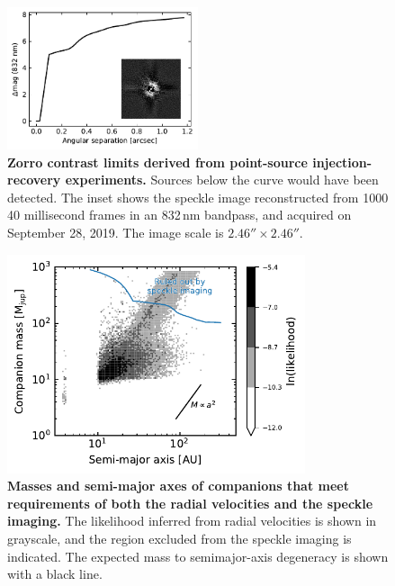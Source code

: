 \documentclass[12pt,twocolumn,tighten]{aastex62}
\begin{document}
\begin{figure}[!t]
	\begin{center}
		\leavevmode
		\includegraphics[width=0.5\textwidth]{f3.pdf}
	\end{center}
	\vspace{-0.7cm}
    \caption{
      {\bf Zorro contrast limits derived from point-source
      injection-recovery experiments.} Sources below the curve would
      have been detected.  The inset shows the speckle image
      reconstructed from 1000 40 millisecond frames in an 832$\,$nm
      bandpass, and acquired on September 28, 2019.  The image scale
      is $2.46''\times2.46''$.
    }
    \label{fig:zorro}
\end{figure}

\begin{figure}[t]
	\begin{center}
		\leavevmode
		\includegraphics[width=0.78\textwidth]{f4.pdf}
	\end{center}
	\vspace{-0.6cm}
	\caption{
    {\bf Masses and semi-major axes of companions that meet
    requirements of both the radial velocities and the speckle
    imaging.} The likelihood inferred from radial velocities is shown
    in grayscale, and the region excluded from the speckle imaging is
    indicated.  The expected mass to semimajor-axis degeneracy is
    shown with a black line.
	\label{fig:mass_sma}
  \vspace{-0cm}
	}
\end{figure}
\end{document}

